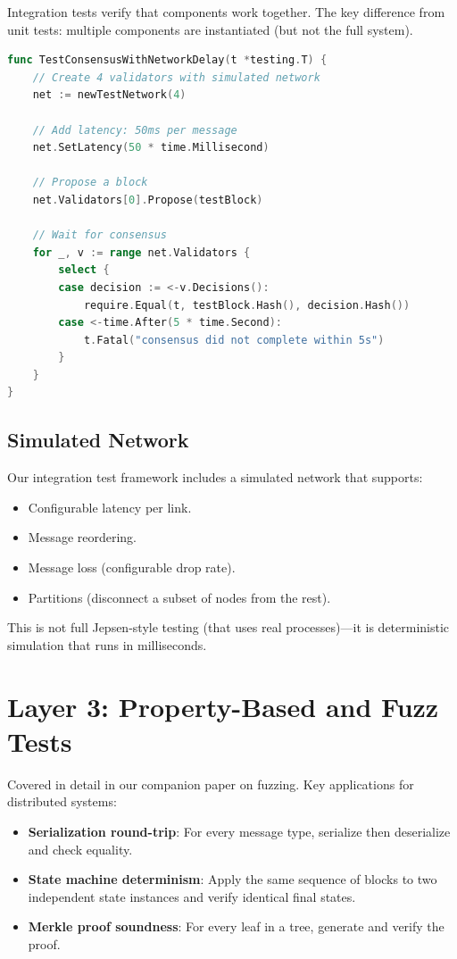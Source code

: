 \documentclass[11pt,a4paper]{article}
\begin{document}
Integration tests verify that components work together. The key difference from unit
tests: multiple components are instantiated (but not the full system).

\begin{lstlisting}[language=Go,caption={Integration test for consensus + networking}]
func TestConsensusWithNetworkDelay(t *testing.T) {
    // Create 4 validators with simulated network
    net := newTestNetwork(4)

    // Add latency: 50ms per message
    net.SetLatency(50 * time.Millisecond)

    // Propose a block
    net.Validators[0].Propose(testBlock)

    // Wait for consensus
    for _, v := range net.Validators {
        select {
        case decision := <-v.Decisions():
            require.Equal(t, testBlock.Hash(), decision.Hash())
        case <-time.After(5 * time.Second):
            t.Fatal("consensus did not complete within 5s")
        }
    }
}
\end{lstlisting}

\subsection{Simulated Network}

Our integration test framework includes a simulated network that supports:
\begin{itemize}[nosep]
  \item Configurable latency per link.
  \item Message reordering.
  \item Message loss (configurable drop rate).
  \item Partitions (disconnect a subset of nodes from the rest).
\end{itemize}

This is not full Jepsen-style testing (that uses real processes)---it is deterministic
simulation that runs in milliseconds.

\section{Layer 3: Property-Based and Fuzz Tests}

Covered in detail in our companion paper on fuzzing. Key applications for distributed
systems:

\begin{itemize}[nosep]
  \item \textbf{Serialization round-trip}: For every message type, serialize then
    deserialize and check equality.
  \item \textbf{State machine determinism}: Apply the same sequence of blocks to two
    independent state instances and verify identical final states.
  \item \textbf{Merkle proof soundness}: For every leaf in a tree, generate and verify
    the proof.
\end{itemize}
\end{document}
